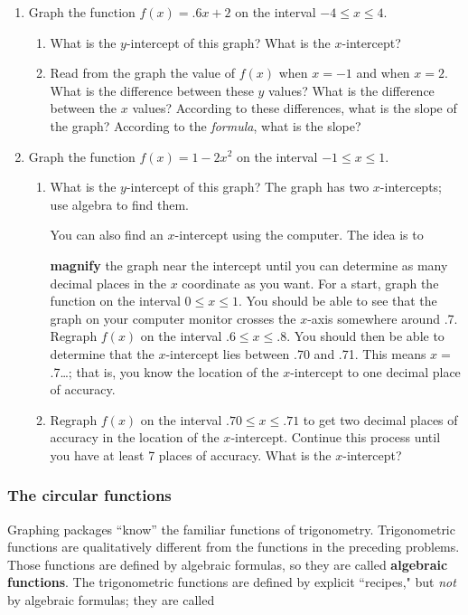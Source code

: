 \begin{enumerate}
\item Graph the function $f(x) = .6 x + 2$ on the interval $-4 \leq x \leq 4$.

  \begin{enumerate}
  \item What is the $y$-intercept of this graph?  What is the $x$-intercept?

  \item Read from the graph the value of $f(x)$ when $x = -1$ and when $x
= 2$.  What is the difference between these $y$ values?  What is the
difference between the $x$ values?  According to these differences,
what is the slope of the graph?  According to the {\em formula}, what
is the slope?


\end{enumerate}
\item Graph the function $f(x) = 1 - 2 x^2$ on the interval $-1 \leq x
\leq 1$.\label{roots}


  \begin{enumerate}
  \item What is the $y$-intercept of this graph?  The graph has two
$x$-intercepts; use algebra to find them.



You can also find an $x$-intercept using the computer.  The idea is to

{\bf magnify} the graph near the intercept until you
can determine as many decimal places in the $x$ coordinate as you
want.  For a start, graph the function on the interval $0\leq
x\leq1$. You should be able to see that the graph on your computer
monitor crosses the $x$-axis somewhere around .7.  Regraph $f(x)$ on
the interval $.6 \leq x \leq .8$.  You should then be able to
determine that the $x$-intercept lies between .70 and .71.  This means
$x =$ .7\ldots ; that is, you know the location of the $x$-intercept
to one decimal place of accuracy.

  \item Regraph $f(x)$ on the interval $.70 \leq x \leq .71$ to get two
decimal places of accuracy in the location of the $x$-intercept.
Continue this process until you have at least 7 places of accuracy.
What is the $x$-intercept?




  \end{enumerate}
\end{enumerate}
\subsubsection{The circular functions}
Graphing packages ``know'' the familiar
functions of trigonometry.  Trigonometric functions are qualitatively
different from the functions in the preceding problems.  Those
functions are defined by algebraic formulas, so they are called {\bf
  algebraic functions}.  The trigonometric functions are defined by explicit
``recipes," but {\em not\/} by algebraic formulas; they are called

